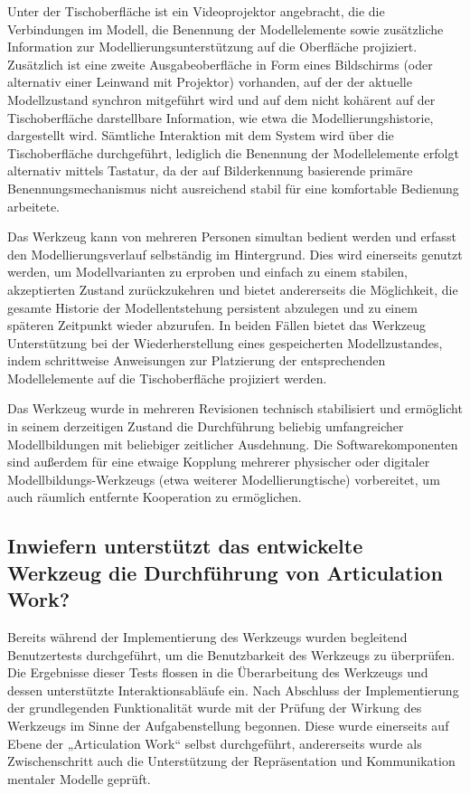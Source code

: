 Unter der Tischoberfläche ist ein Videoprojektor angebracht, die die Verbindungen im Modell, die Benennung der Modellelemente sowie zusätzliche Information zur Modellierungsunterstützung auf die Oberfläche projiziert. Zusätzlich ist eine zweite Ausgabeoberfläche in Form eines Bildschirms (oder alternativ einer Leinwand mit Projektor) vorhanden, auf der der aktuelle Modellzustand synchron mitgeführt wird und auf dem nicht kohärent auf der Tischoberfläche darstellbare Information, wie etwa die Modellierungshistorie, dargestellt wird. Sämtliche Interaktion mit dem System wird über die Tischoberfläche durchgeführt, lediglich die Benennung der Modellelemente erfolgt alternativ mittels Tastatur, da der auf Bilderkennung basierende primäre Benennungsmechanismus nicht ausreichend stabil für eine komfortable Bedienung arbeitete.

Das Werkzeug kann von mehreren Personen simultan bedient werden und erfasst den Modellierungsverlauf selbständig im Hintergrund. Dies wird einerseits genutzt werden, um Modellvarianten zu erproben und einfach zu einem stabilen, akzeptierten Zustand zurückzukehren und bietet andererseits die Möglichkeit, die gesamte Historie der Modellentstehung persistent abzulegen und zu einem späteren Zeitpunkt wieder abzurufen. In beiden Fällen bietet das Werkzeug Unterstützung bei der Wiederherstellung eines gespeicherten Modellzustandes, indem schrittweise Anweisungen zur Platzierung der entsprechenden Modellelemente auf die Tischoberfläche projiziert werden.

Das Werkzeug wurde in mehreren Revisionen technisch stabilisiert und ermöglicht in seinem derzeitigen Zustand die Durchführung beliebig umfangreicher Modellbildungen mit beliebiger zeitlicher Ausdehnung. Die Softwarekomponenten sind außerdem für eine etwaige Kopplung mehrerer physischer oder digitaler Modellbildungs-Werkzeugs (etwa weiterer Modellierungtische) vorbereitet, um auch räumlich entfernte Kooperation zu ermöglichen. 

\subsection{Inwiefern unterstützt das entwickelte Werkzeug die Durchführung von Articulation Work?}

Bereits während der Implementierung des Werkzeugs wurden begleitend Benutzertests durchgeführt, um die Benutzbarkeit des Werkzeugs zu überprüfen. Die Ergebnisse dieser Tests flossen in die Überarbeitung des Werkzeugs und dessen unterstützte Interaktionsabläufe ein. Nach Abschluss der Implementierung der grundlegenden Funktionalität wurde mit der Prüfung der Wirkung des Werkzeugs im Sinne der Aufgabenstellung begonnen. Diese wurde einerseits auf Ebene der „Articulation Work“ selbst durchgeführt, andererseits wurde als Zwischenschritt auch die Unterstützung der Repräsentation und Kommunikation mentaler Modelle geprüft.

